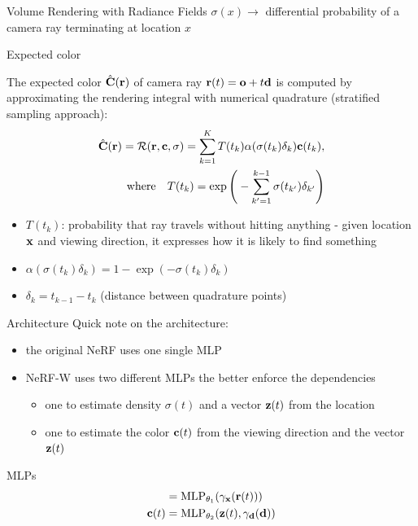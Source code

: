 \documentclass[aspectratio=1610]{beamer}
\newcommand{\parenth}[2][]{#1(#2#1)}
\begin{document}
\begin{frame}{Volume Rendering with Radiance Fields}
    \(\sigma(x) \rightarrow\) differential probability of a camera ray terminating at location \(x\)

    \begin{block}{Expected color}
        
        The expected color \(\hat{\vb{C}}(\vb{r})\) of camera ray \(\vb{r}(t) = \vb{o} + t\vb{d}\) is computed by approximating the rendering integral with numerical quadrature (stratified sampling approach):
        \begin{align}
            \hat{\vb{C}}(\vb{r}) = \mathcal{R}(\vb{r}, \vb{c}, \sigma) = \sum_{k = 1}^{K} T(t_k) \alpha (\sigma (t_k)\delta_k) \vb{c}(t_k),\\
            \textrm{where} \quad T(t_k) = \exp \parenth[\Bigg]{-\sum_{k' = 1}^{k - 1} \sigma (t_{k'}) \delta_{k'}} 
        \end{align}
    \end{block}
    \begin{itemize}
        \item \(T(t_k)\): probability that ray travels without hitting anything - given location \(\vb{x}\) and viewing direction, it expresses how it is likely to find something
        \item \(\alpha(\sigma (t_k)\delta_k) = 1 - \exp(- \sigma (t_k)\delta_k)\) 
        \item \(\delta_k = t_{k-1} - t_k\) (distance between quadrature points)
    \end{itemize}
\end{frame}

\begin{frame}{Architecture}
    Quick note on the architecture:
    \begin{itemize}
        \item the original NeRF uses one single MLP
        \item NeRF-W uses two different MLPs the better enforce the dependencies
        \begin{itemize}
            \item one to estimate density \(\sigma(t)\) and a vector \(\vb{z}(t)\) from the location
            \item one to estimate the color \(\vb{c}(t)\) from the viewing direction and the vector \(\vb{z}(t)\)
        \end{itemize}
    \end{itemize}
    \begin{block}{MLPs}
        \begin{align}
            [\sigma(t), \vb{z}(t)] &= \textrm{MLP}_{\theta_1} (\gamma_{\vb{x}}(\vb{r}(t))) \\
            \vb{c}(t) &= \textrm{MLP}_{\theta_2} (\vb{z}(t), \gamma_{\vb{d}}(\vb{d}))
        \end{align}
    \end{block}
\end{frame}
\end{document}
